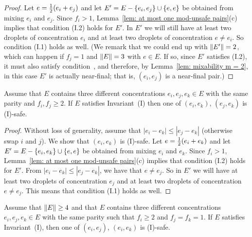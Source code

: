 \begin{proof}
	Let $e = {\textstyle\frac{1}{2}}(e_i+e_j)$ and let $E' = E-{ \left\{ e_i,e_j \right\} }\cup{ \left\{ e,e \right\} }$ be obtained from
	mixing $e_i$ and $e_j$. 	
	Since $f_i > 1$, Lemma~\ref{lem: at most one mod-unsafe pairs}(c) implies that
	condition (I.2) holds for $E'$.	In $E'$ we will still have at least two droplets of
	concentration $e_i$ and at least two droplets of concentration $e\neq e_i$.
	So condition (I.1) holds as well.
	(We remark that we could end up with ${\|E'\|} = 2$, which can happen if $f_j = 1$
	and ${\|E\|}=3$ with $e\in E$.
	If so, since $E'$ satisfies (I.2), it must also satisfy condition~{\MixCond}, and
	therefore, by Lemma~\ref{lem: mixability m = 2}, in this case $E'$ is actually near-final;
	that is, $(e_i,e_j)$ is a near-final pair.)
\end{proof}



\begin{lemma}%
	\label{lem: invariant, three same parity, fi, fj >= 2}
	Assume that $E$ contains three different concentrations $e_i,e_j, e_k\in E$
	with the same parity and $f_i, f_j\ge 2$.
	If $E$ satisfies Invariant~(I) then one of $(e_i,e_k)$, $(e_j,e_k)$ is (I)-safe.
\end{lemma}%

\begin{proof}
	Without loss of generality, assume that $|e_i-e_k| \le |e_j-e_k|$ (otherwise
	swap $i$ and $j$). We show that $(e_i,e_k)$ is (I)-safe.
	Let $e = {\textstyle\frac{1}{2}}(e_i+e_k)$ and let $E' = E-{ \left\{ e_i,e_k \right\} }\cup{ \left\{ e,e \right\} }$ be obtained from
	mixing $e_i$ and $e_k$. 
	Since $f_i > 1$, Lemma~\ref{lem: at most one mod-unsafe pairs}(c) implies that
	condition (I.2) holds for $E'$.
	From $|e_i-e_k| \le |e_j-e_k|$, we have that $e\neq e_j$.
	So in $E'$ we will have at least two droplets of
	concentration $e_j$ and at least two droplets of concentration $e\neq e_j$.
	This means that condition (I.1) holds as well.
\end{proof}


\begin{lemma}%
	\label{lem: invariant, m >= 4, three same parity, fi >= 2, fj = fk = 1}
	Assume that ${\|E\|}\ge 4$ and that
	 $E$ contains three different concentrations $e_i,e_j, e_k\in E$
	with the same parity such that $f_i\ge 2$ and $f_j = f_k = 1$.
	If $E$ satisfies Invariant~(I),
	then one of $(e_i,e_j)$, $(e_i,e_k)$ is (I)-safe.
\end{lemma}%

